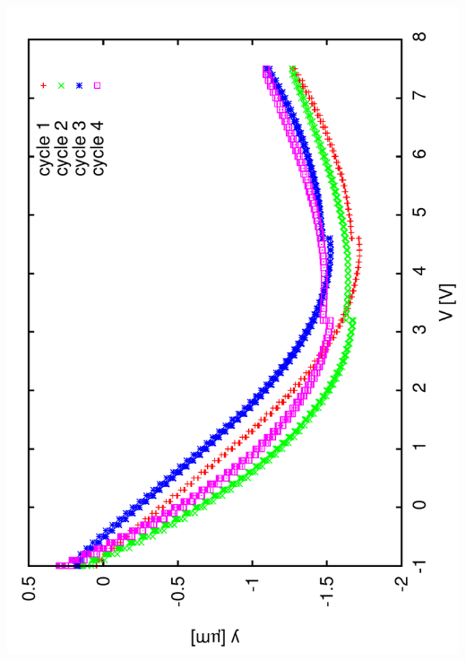 \documentclass[a4paper,11pt]{book}
\begin{document}
\includegraphics[angle=-90,scale=0.15]{image72.pdf}
\end{document}
